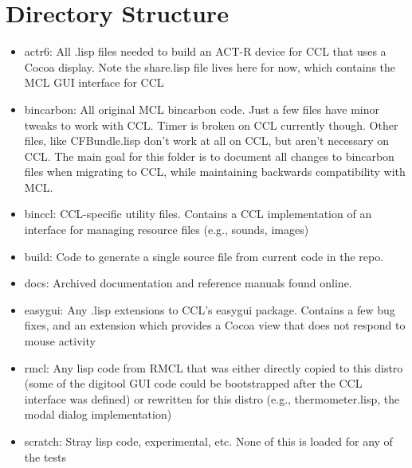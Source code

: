 \documentclass[12pt]{article} %
\begin{document}

\section{Directory Structure} %

\begin{itemize}

\item actr6: All .lisp files needed to build an ACT-R device for CCL that uses a Cocoa display. Note the share.lisp file lives here for now, which contains the MCL GUI interface for CCL

\item bincarbon: All original MCL bincarbon code. Just a few files have minor tweaks to work with CCL. Timer is broken on CCL currently though. Other files, like CFBundle.lisp don't work at all on CCL, but aren't necessary on CCL. The main goal for this folder is to document all changes to bincarbon files when migrating to CCL, while maintaining backwards compatibility with MCL.

\item binccl: CCL-specific utility files. Contains a CCL implementation of an interface for managing resource files (e.g., sounds, images)

\item build: Code to generate a single source file from current code in the repo.

\item docs: Archived documentation and reference manuals found online.

\item easygui: Any .lisp extensions to CCL's easygui package. Contains a few bug fixes, and an extension which provides a Cocoa view that does not respond to mouse activity	
\item rmcl: Any lisp code from RMCL that was either directly copied to this distro (some of the digitool GUI code could be bootstrapped after the CCL interface was defined) or rewritten for this distro (e.g., thermometer.lisp, the modal dialog implementation)

\item scratch: Stray lisp code, experimental, etc. None of this is loaded for any of the tests


\end{itemize}
\end{document}
